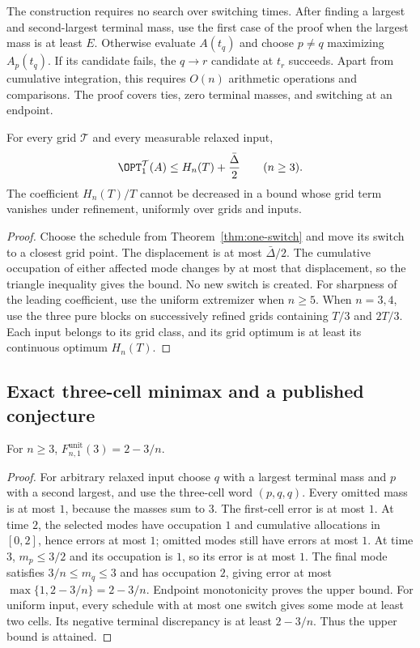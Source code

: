 The construction requires no search over switching times. After finding a
largest and second-largest terminal mass, use the first case of the proof
when the largest mass is at least $E$. Otherwise evaluate $A(t_q)$ and
choose $p\ne q$ maximizing $A_p(t_q)$. If its candidate fails, the
$q\to r$ candidate at $t_r$ succeeds. Apart from cumulative integration,
this requires $O(n)$ arithmetic operations and comparisons. The proof covers
ties, zero terminal masses, and switching at an endpoint.

\begin{corollary}\label{cor:one-switch-grid}
For every grid $\mathcal T$ and every measurable relaxed input,
\[
 \OPT_1^{\mathcal T}(A)\le H_n(T)+\frac{\bar\Delta}{2}\qquad(n\ge3).
\]
The coefficient $H_n(T)/T$ cannot be decreased in a bound whose grid term
vanishes under refinement, uniformly over grids and inputs.
\end{corollary}
\begin{proof}
Choose the schedule from Theorem~\ref{thm:one-switch} and move its switch to
a closest grid point. The displacement is at most $\bar\Delta/2$. The
cumulative occupation of either affected mode changes by at most that
displacement, so the triangle inequality gives the bound. No new switch is
created. For sharpness of the leading coefficient, use the uniform extremizer
when $n\ge5$. When $n=3,4$, use the three pure blocks on successively refined
grids containing $T/3$ and $2T/3$. Each input belongs to its grid class, and
its grid optimum is at least its continuous optimum $H_n(T)$.
\end{proof}

\subsection{Exact three-cell minimax and a published conjecture}

\begin{proposition}\label{prop:three-cells}
For $n\ge3$, $F^{\mathrm{unit}}_{n,1}(3)=2-3/n$.
\end{proposition}
\begin{proof}
For arbitrary relaxed input choose $q$ with a largest terminal mass and $p$
with a second largest, and use the three-cell word $(p,q,q)$. Every omitted
mass is at most $1$, because the masses sum to $3$. The first-cell error is
at most $1$. At time $2$, the selected modes have occupation $1$ and
cumulative allocations in $[0,2]$, hence errors at most $1$; omitted modes
still have errors at most $1$. At time $3$, $m_p\le3/2$ and its occupation
is $1$, so its error is at most $1$. The final mode satisfies
$3/n\le m_q\le3$ and has occupation $2$, giving error at most
$\max\{1,2-3/n\}=2-3/n$. Endpoint monotonicity proves the upper bound.
For uniform input, every schedule with at most one switch gives some mode
at least two cells. Its negative terminal discrepancy is at least
$2-3/n$. Thus the upper bound is attained.
\end{proof}

